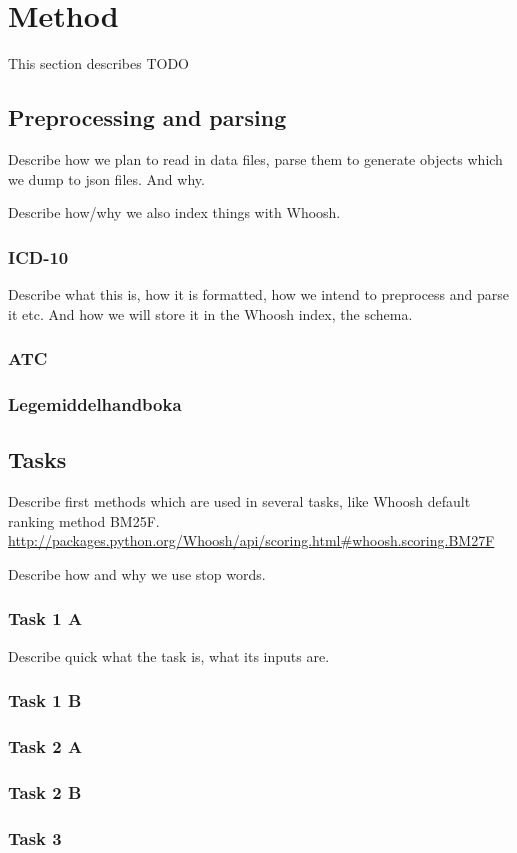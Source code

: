 \chapter{Method}
This section describes TODO


\section{Preprocessing and parsing}
Describe how we plan to read in data files, parse them to generate objects
which we dump to json files. And why.

Describe how/why we also index things with Whoosh.

\subsection{ICD-10}
Describe what this is, how it is formatted, how we intend to preprocess and
parse it etc. And how we will store it in the Whoosh index, the schema.

\subsection{ATC}

\subsection{Legemiddelhandboka} %


\section{Tasks}
Describe first methods which are used in several tasks, like Whoosh default
ranking method BM25F.
\url{http://packages.python.org/Whoosh/api/scoring.html#whoosh.scoring.BM27F}

Describe how and why we use stop words.

\subsection{Task 1 A}
Describe quick what the task is, what its inputs are.

\subsection{Task 1 B}

\subsection{Task 2 A}

\subsection{Task 2 B}

\subsection{Task 3}



